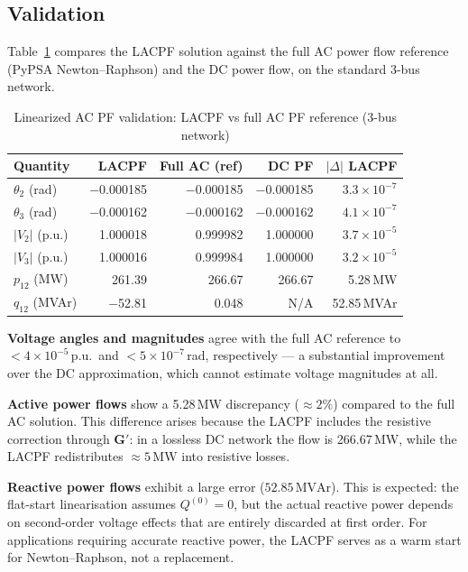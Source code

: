 \subsection{Validation}

Table~\ref{tab:lacpf_validation} compares the LACPF solution against the full AC power flow reference (PyPSA Newton--Raphson) and the DC power flow, on the standard 3-bus network.

\begin{table}[H]
\centering
\caption{Linearized AC PF validation: LACPF vs full AC PF reference (3-bus network)}
\label{tab:lacpf_validation}
\begin{tabular}{lrrrr}
\toprule
\textbf{Quantity} & \textbf{LACPF} & \textbf{Full AC (ref)} & \textbf{DC PF} & \textbf{$|\Delta|$ LACPF} \\
\midrule
$\theta_2$ (rad)    & $-$0.000185 & $-$0.000185 & $-$0.000185 & $3.3 \times 10^{-7}$ \\
$\theta_3$ (rad)    & $-$0.000162 & $-$0.000162 & $-$0.000162 & $4.1 \times 10^{-7}$ \\
$|V_2|$ (p.u.)      &  1.000018   &  0.999982   &  1.000000   & $3.7 \times 10^{-5}$ \\
$|V_3|$ (p.u.)      &  1.000016   &  0.999984   &  1.000000   & $3.2 \times 10^{-5}$ \\
$p_{12}$ (MW)       &  261.39     &  266.67     &  266.67     & 5.28\,MW \\
$q_{12}$ (MVAr)     & $-$52.81    &   0.048     & N/A         & 52.85\,MVAr \\
\bottomrule
\end{tabular}
\end{table}

\textbf{Voltage angles and magnitudes} agree with the full AC reference to $< 4 \times 10^{-5}$\,p.u.\ and $< 5 \times 10^{-7}$\,rad, respectively --- a substantial improvement over the DC approximation, which cannot estimate voltage magnitudes at all.

\textbf{Active power flows} show a 5.28\,MW discrepancy ($\approx 2\%$) compared to the full AC solution. This difference arises because the LACPF includes the resistive correction through $\mathbf{G}'$: in a lossless DC network the flow is 266.67\,MW, while the LACPF redistributes $\approx 5\,\text{MW}$ into resistive losses.

\textbf{Reactive power flows} exhibit a large error ($52.85\,\text{MVAr}$). This is expected: the flat-start linearisation assumes $Q^{(0)} = 0$, but the actual reactive power depends on second-order voltage effects that are entirely discarded at first order. For applications requiring accurate reactive power, the LACPF serves as a warm start for Newton--Raphson, not a replacement.

